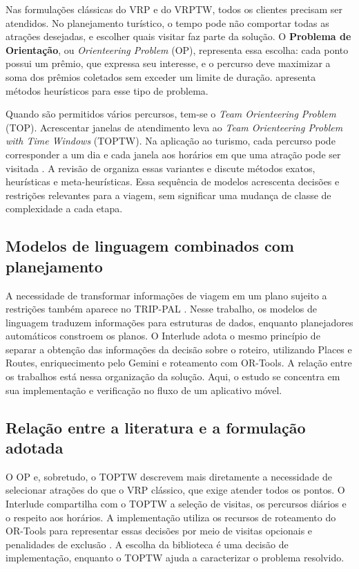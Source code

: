 Nas formulações clássicas do VRP e do VRPTW, todos os clientes precisam ser atendidos. No planejamento turístico, o tempo pode não comportar todas as atrações desejadas, e escolher quais visitar faz parte da solução. O \textbf{Problema de Orientação}, ou \textit{Orienteering Problem} (OP), representa essa escolha: cada ponto possui um prêmio, que expressa seu interesse, e o percurso deve maximizar a soma dos prêmios coletados sem exceder um limite de duração.  apresenta métodos heurísticos para esse tipo de problema.

Quando são permitidos vários percursos, tem-se o \textit{Team Orienteering Problem} (TOP). Acrescentar janelas de atendimento leva ao \textit{Team Orienteering Problem with Time Windows} (TOPTW). Na aplicação ao turismo, cada percurso pode corresponder a um dia e cada janela aos horários em que uma atração pode ser visitada \cite{vansteenwegen2009ils}. A revisão de  organiza essas variantes e discute métodos exatos, heurísticas e meta-heurísticas. Essa sequência de modelos acrescenta decisões e restrições relevantes para a viagem, sem significar uma mudança de classe de complexidade a cada etapa.

\subsection{Modelos de linguagem combinados com planejamento}

A necessidade de transformar informações de viagem em um plano sujeito a restrições também aparece no TRIP-PAL \cite{delarosa2024trippal}. Nesse trabalho, os modelos de linguagem traduzem informações para estruturas de dados, enquanto planejadores automáticos constroem os planos. O Interlude adota o mesmo princípio de separar a obtenção das informações da decisão sobre o roteiro, utilizando Places e Routes, enriquecimento pelo Gemini e roteamento com OR-Tools. A relação entre os trabalhos está nessa organização da solução. Aqui, o estudo se concentra em sua implementação e verificação no fluxo de um aplicativo móvel.

\subsection{Relação entre a literatura e a formulação adotada}

O OP e, sobretudo, o TOPTW descrevem mais diretamente a necessidade de selecionar atrações do que o VRP clássico, que exige atender todos os pontos. O Interlude compartilha com o TOPTW a seleção de visitas, os percursos diários e o respeito aos horários. A implementação utiliza os recursos de roteamento do OR-Tools para representar essas decisões por meio de visitas opcionais e penalidades de exclusão \cite{google_penalties}. A escolha da biblioteca é uma decisão de implementação, enquanto o TOPTW ajuda a caracterizar o problema resolvido.

